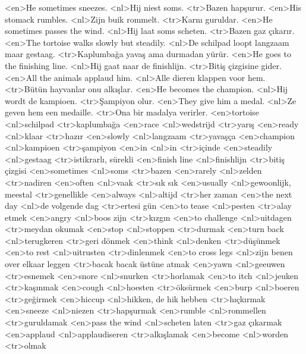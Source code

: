 <en>He sometimes sneezes.
<nl>Hij niest soms.
<tr>Bazen hapşurur.
<en>His stomack rumbles.
<nl>Zijn buik rommelt.
<tr>Karnı guruldar.
<en>He sometimes passes the wind.
<nl>Hij laat soms scheten.
<tr>Bazen gaz çıkarır.
<en>The tortoise walks slowly but steadily.
<nl>De schilpad loopt langzaam maar gestaag.
<tr>Kaplumbağa yavaş ama durmadan yürür.
<en>He goes to the  finishing line.
<nl>Hij gaat naar de finishlijn.
<tr>Bitiş çizgisine gider.
<en>All the animals applaud him.
<nl>Alle dieren klappen voor hem.
<tr>Bütün hayvanlar onu alkışlar.
<en>He becomes the champion.
<nl>Hij wordt de kampioen.
<tr>Şampiyon olur.
<en>They give him a medal.
<nl>Ze geven hem een medaille.
<tr>Ona bir madalya verirler.
<en>tortoise
<nl>schilpad
<tr>kaplumbağa
<en>race
<nl>wedstrijd
<tr>yarış
<en>ready
<nl>klaar
<tr>hazır
<en>slowly
<nl>langzaam
<tr>yavaşça
<en>champion
<nl>kampioen
<tr>şampiyon
<en>in
<nl>in
<tr>içinde
<en>steadily
<nl>gestaag
<tr>istikrarlı, sürekli
<en>finish line
<nl>finishlijn
<tr>bitiş çizgisi
<en>sometimes
<nl>soms
<tr>bazen
<en>rarely
<nl>zelden
<tr>nadiren
<en>often
<nl>vaak
<tr>sık sık
<en>usually
<nl>gewoonlijk, meestal
<tr>genellikle
<en>always
<nl>altijd
<tr>her zaman
<en>the next day
<nl>de volgende dag
<tr>ertesi gün
<en>to tease
<nl>pesten
<tr>alay etmek
<en>angry
<nl>boos zijn 
<tr>kızgın
<en>to challenge
<nl>uitdagen
<tr>meydan okumak
<en>stop
<nl>stoppen
<tr>durmak
<en>turn back
<nl>terugkeren
<tr>geri dönmek
<en>think
<nl>denken
<tr>düşünmek
<en>to rest
<nl>uitrusten
<tr>dinlenmek
<en>to cross legs
<nl>zijn benen over elkaar leggen
<tr>bacak bacak üstüne atmak
<en>yawn
<nl>geeuwen
<tr>esnemek
<en>snore
<nl>snurken
<tr>horlamak
<en>to itch
<nl>jeuken
<tr>kaşınmak
<en>cough
<nl>hoesten
<tr>öksürmek
<en>burp
<nl>boeren
<tr>geğirmek
<en>hiccup
<nl>hikken, de hik hebben
<tr>hıçkırmak
<en>sneeze
<nl>niezen
<tr>hapşurmak
<en>rumble
<nl>rommellen
<tr>guruldamak
<en>pass the wind
<nl>scheten laten
<tr>gaz çıkarmak
<en>applaud
<nl>applaudiseren
<tr>alkışlamak
<en>become
<nl>worden
<tr>olmak
